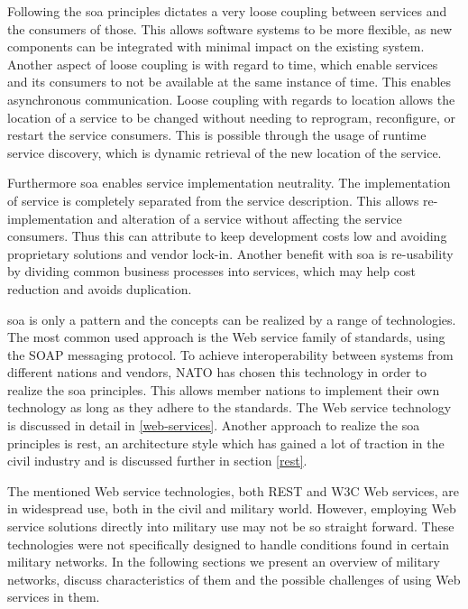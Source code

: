Following the \gls{soa} principles dictates a very loose coupling between
services and the consumers of those. This allows software systems to be more
flexible, as new components can be integrated with minimal impact on the
existing system. Another aspect of loose coupling is with regard to time, which
enable services and its consumers to not be available at the same instance of
time. This enables asynchronous communication. Loose coupling with regards to
location allows the location of a service to be changed without needing to
reprogram, reconfigure, or restart the service consumers. This is possible
through the usage of runtime service discovery, which is dynamic retrieval of
the new location of the service.

Furthermore \gls{soa} enables service implementation neutrality. The
implementation of service is completely separated from the service
description. This allows re-implementation and alteration of a service without
affecting the service consumers. Thus this can attribute to keep development
costs low and avoiding proprietary solutions and vendor lock-in. Another
benefit with \gls{soa} is re-usability by dividing common business processes
into services, which may help cost reduction and avoids duplication.

\gls{soa} is only a pattern and the concepts can be realized by a range of
technologies. The most common used approach is the Web service family of
standards, using the SOAP messaging protocol. To achieve interoperability
between systems from different nations and vendors, NATO has chosen this
technology in order to realize the \gls{soa} principles\cite{soa-baseline}. This
allows member nations to implement their own technology as long as they adhere
to the standards. The Web service technology is discussed in detail in
\cref{web-services}. Another approach to realize the \gls{soa} principles is
\gls{rest}, an architecture style which has gained a lot of traction in the
civil industry and is discussed further in section \cref{rest}.

The mentioned Web service technologies, both REST and W3C Web services, are in
widespread use, both in the civil and military world. However, employing Web
service solutions directly into military use may not be so straight forward.
These technologies were not specifically designed to handle conditions found in
certain military networks. In the following sections we present an overview of
military networks, discuss characteristics of them and the possible challenges
of using Web services in them.


